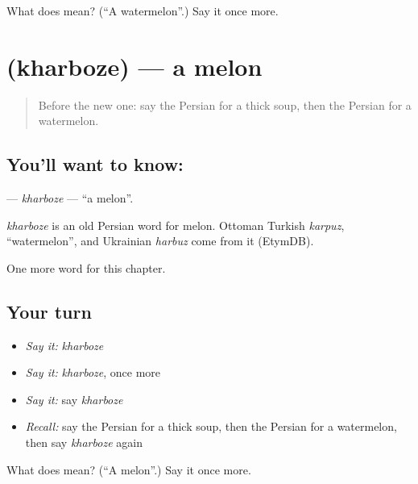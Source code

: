 \begin{tcolorbox}[breakable,colback=teal!4,colframe=teal!35!black,title={Before you move on}]
What does  mean? (\textquotedblleft{}A watermelon\textquotedblright{}.) Say it once more.
\end{tcolorbox}
\section[\texorpdfstring{\fa{خربزه} (kharboze)}{خربزه (kharboze)}]{ (kharboze) — a melon}

\label{lesson:FA-C99-kharboze}



\begin{quote}
Before the new one: say the Persian for a thick soup, then the Persian for a watermelon.
\end{quote}

\subsection*{You'll want to know: }
\textbf{} — \emph{kharboze} — \textquotedblleft{}a melon\textquotedblright{}.

\begin{cousinweb}
\emph{kharboze} is an old Persian word for melon. Ottoman Turkish \emph{karpuz}, \textquotedblleft{}watermelon\textquotedblright{}, and Ukrainian \emph{harbuz} come from it (EtymDB).
\end{cousinweb}

\begin{grammarlens}[title={What you've built}]
One more word for this chapter.
\end{grammarlens}

\subsection*{Your turn}
\begin{itemize}
\raggedright
  \item \emph{Say it:} \emph{kharboze}
  \item \emph{Say it:} \emph{kharboze}, once more
  \item \emph{Say it:} say \emph{kharboze}
  \item \emph{Recall:} say the Persian for a thick soup, then the Persian for a watermelon, then say \emph{kharboze} again
\end{itemize}

\begin{tcolorbox}[breakable,colback=teal!4,colframe=teal!35!black,title={Before you move on}]
What does  mean? (\textquotedblleft{}A melon\textquotedblright{}.) Say it once more.
\end{tcolorbox}
